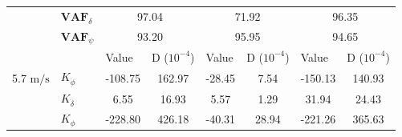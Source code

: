 \begin{table}[]
\begin{tabular}{llcccccc}
                                    & $\mathbf{VAF}_\delta$ & \multicolumn{2}{c}{97.04}                                                                       & \multicolumn{2}{c}{71.92}                                                                       & \multicolumn{2}{c}{96.35}                                                                       \\
                                    & $\mathbf{VAF}_\psi$   & \multicolumn{2}{c}{93.20}                                                                       & \multicolumn{2}{c}{95.95}                                                                       & \multicolumn{2}{c}{94.65}                                                                       \\ \hline
                                    &                       & \multicolumn{1}{l}{\multirow{2}{*}{Value}} & \multicolumn{1}{l}{\multirow{2}{*}{D ($10^{-4}$)}} & \multicolumn{1}{l}{\multirow{2}{*}{Value}} & \multicolumn{1}{l}{\multirow{2}{*}{D ($10^{-4}$)}} & \multicolumn{1}{l}{\multirow{2}{*}{Value}} & \multicolumn{1}{l}{\multirow{2}{*}{D ($10^{-4}$)}} \\
                                    &                       & \multicolumn{1}{l}{}                       & \multicolumn{1}{l}{}                               & \multicolumn{1}{l}{}                       & \multicolumn{1}{l}{}                               & \multicolumn{1}{l}{}                       & \multicolumn{1}{l}{}                               \\ \cline{3-8} 
    5.7 $\si{\meter\per\second}$ & $K_{\dot{\phi}} $     & -108.75                                    & 162.97                                             & -28.45                                     & 7.54                                               & -150.13                                    & 140.93                                             \\
                                    & $K_{\dot{\delta}}$    & 6.55                                       & 16.93                                              & 5.57                                       & 1.29                                               & 31.94                                      & 24.43                                              \\
                                    & $K_{\phi} $           & -228.80                                    & 426.18                                             & -40.31                                     & 28.94                                              & -221.26                                    & 365.63                                             \\

\end{tabular}
\end{table}
